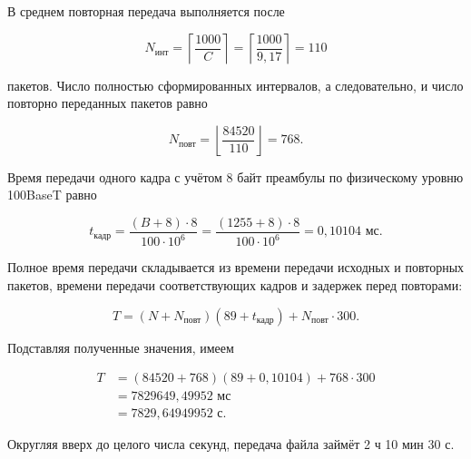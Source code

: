 В среднем повторная передача выполняется после

\[
	N_{\text{инт}} = \left\lceil\frac{1000}{C}\right\rceil
	= \left\lceil\frac{1000}{9{,}17}\right\rceil = 110
\]

пакетов. Число полностью сформированных интервалов, а следовательно,
и число повторно переданных пакетов равно

\[
	N_{\text{повт}} = \left\lfloor\frac{84520}{110}\right\rfloor = 768.
\]

Время передачи одного кадра с учётом 8 байт преамбулы по физическому
уровню 100BaseT равно

\[
	t_{\text{кадр}} = \frac{(B + 8) \cdot 8}{100 \cdot 10^6}
	= \frac{(1255 + 8) \cdot 8}{100 \cdot 10^6}
	= 0{,}10104\text{ мс}.
\]

Полное время передачи складывается из времени передачи исходных и повторных
пакетов, времени передачи соответствующих кадров и задержек перед повторами:

\[
	T = (N + N_{\text{повт}})(89 + t_{\text{кадр}})
	+ N_{\text{повт}} \cdot 300.
\]

Подставляя полученные значения, имеем

\[
	\begin{aligned}
		T &= (84520 + 768)(89 + 0{,}10104) + 768 \cdot 300 \\
		  &= 7829649{,}49952\text{ мс} \\
		  &= 7829{,}64949952\text{ с}.
	\end{aligned}
\]

Округляя вверх до целого числа секунд, передача файла займёт
2 ч 10 мин 30 с.
